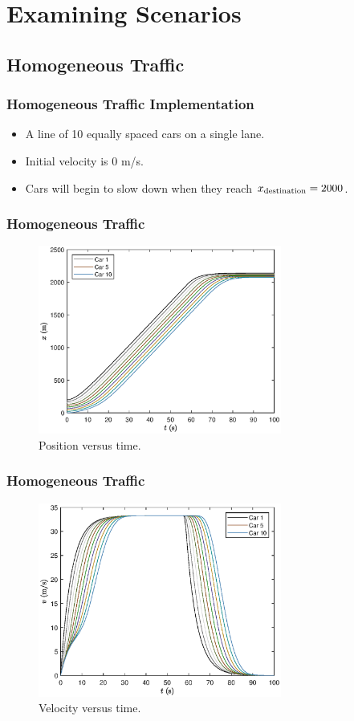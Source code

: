 \documentclass{beamer}
\begin{document}
\section{Examining Scenarios}

\subsection{Homogeneous Traffic}

\begin{frame}
  \frametitle{Homogeneous Traffic Implementation}
  \begin{itemize}
    \item A line of 10 equally spaced cars on a single lane.
    \item Initial velocity is $0$ m/s. 
    \item Cars will begin to slow down when they reach $x_{\rm destination} = 2000$.
  \end{itemize}
\end{frame}

\begin{frame}
  \frametitle{Homogeneous Traffic}
  \begin{figure}[H]
    \includegraphics[width=8cm]{HomogeneousTraffic1.eps}
    \caption{Position versus time.} 
\end{figure}
\end{frame}

\begin{frame}
  \frametitle{Homogeneous Traffic}
  \begin{figure}[H]
    \includegraphics[width=8cm]{HomogeneousTraffic2.eps}
    \caption{Velocity versus time.}
\end{figure}
\end{frame}
\end{document}

